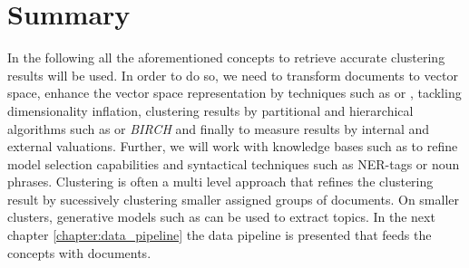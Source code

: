\section{Summary}
\label{sec:basics_summary}

In the following all the aforementioned concepts to retrieve accurate clustering results will be used. In order to do so, we need to transform documents to vector space, enhance the vector space representation by techniques such as \lsa{} or \pca{}, tackling dimensionality inflation, clustering results by partitional and hierarchical algorithms such as \kmeans{} or \emph{BIRCH} and finally to measure results by internal and external valuations. Further, we will work with knowledge bases such as \wordnet{} to refine model selection capabilities and syntactical techniques such as NER-tags or noun phrases. Clustering is often a multi level approach that refines the clustering result by sucessively clustering smaller assigned groups of documents. On smaller clusters, generative models such as \lda{} can be used to extract topics. In the next chapter \ref{chapter:data_pipeline} the data pipeline is presented that feeds the concepts with documents.


